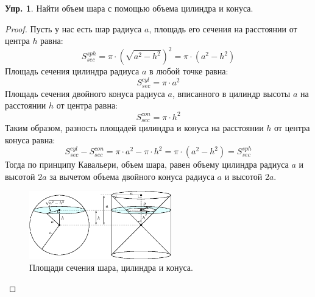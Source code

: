 \documentclass[12pt]{article}
\theoremstyle{definition}
\newtheorem{exrc}{Упр.}
\begin{document}
\begin{exrc}
	Найти объем шара с помощью объема цилиндра и конуса.
\end{exrc}
\begin{proof}
	Пусть у нас есть шар радиуса $a$, площадь его сечения на расстоянии от центра $h$ равна:
	$$
		S_{sec}^{sph} = \pi{\cdot}\left(\sqrt{a^2 - h^2}\right)^2 = \pi{\cdot}(a^2 - h^2)
	$$
	Площадь сечения цилиндра радиуса $a$ в любой точке равна:
	$$
		S_{sec}^{cyl} = \pi{\cdot}a^2
	$$
	Площадь сечения двойного конуса радиуса $a$, вписанного в цилиндр высоты $a$ на расстоянии $h$ от центра равна:
	$$
		S_{sec}^{con} = \pi{\cdot}h^2
	$$
	Таким образом, разность площадей цилиндра и конуса на расстоянии $h$ от центра конуса равна:
	$$
		S_{sec}^{cyl} - S_{sec}^{con} = \pi{\cdot}a^2 - \pi{\cdot}h^2 = \pi{\cdot}(a^2 - h^2) = S_{sec}^{sph}
	$$
	Тогда по принципу Кавальери, объем шара, равен объему цилиндра радиуса $a$ и высотой $2a$ за вычетом объема двойного конуса радиуса $a$ и высотой $2a$.
	\begin{figure}[H]
		\centering
		\includegraphics[width=0.55\textwidth]{MA4L5_4.eps}
		\caption{Площади сечения шара, цилиндра и конуса.}
		\label{5_4}
	\end{figure}
\end{proof}
\newpage
\end{document}
